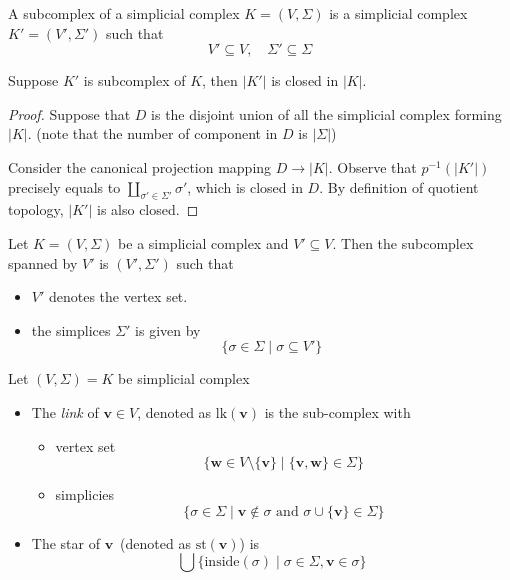 \begin{definition}
A subcomplex of a simplicial complex $K=(V,\Sigma)$ is a simplicial complex $K'=(V',\Sigma')$ such that 
\[
V'\subseteq V,\quad
\Sigma'\subseteq\Sigma
\]
\end{definition}
\begin{proposition}
Suppose $K'$ is subcomplex of $K$, then $|K'|$ is closed in $|K|$.
\end{proposition}
\begin{proof}
Suppose that $D$ is the disjoint union of all the simplicial complex forming $|K|$. (note that the number of component in $D$ is $|\Sigma|$)

Consider the canonical projection mapping $D\to|K|$. Observe that $p^{-1}(|K'|)$ precisely equals to $\coprod_{\sigma'\in\Sigma'}\sigma'$, which is closed in $D$.
By definition of quotient topology, $|K'|$ is also closed. 
\end{proof}

\begin{definition}
Let $K=(V,\Sigma)$ be a simplicial complex and $V'\subseteq V$.
Then the subcomplex spanned by $V'$ is $(V',\Sigma')$ such that
\begin{itemize}
\item
$V'$ denotes the vertex set.
\item
the simplices $\Sigma'$ is given by
\[
\{\sigma\in\Sigma\mid\sigma\subseteq V'\}
\]
\end{itemize}
\end{definition}

\begin{definition}
Let $(V,\Sigma)=K$ be simplicial complex
\begin{itemize}
\item
The \emph{link} of $\bm v\in V$, denoted as $\text{lk}(\bm v)$ is the sub-complex with
\begin{itemize}
\item
vertex set
\[
\{\bm w\in V\setminus\{\bm v\}\mid \{\bm v,\bm w\}\in\Sigma\}
\]
\item
simplicies
\[
\{\sigma\in\Sigma\mid\bm v\notin\sigma\text{ and }\sigma\cup\{\bm v\}\in\Sigma\}
\]
\end{itemize}
\item
The star of $\bm v$~(denoted as $\text{st}(\bm v)$) is
\[
\bigcup\{\text{inside}(\sigma)\mid \sigma\in\Sigma,\bm v\in\sigma\}
\]
\end{itemize}
\end{definition}

